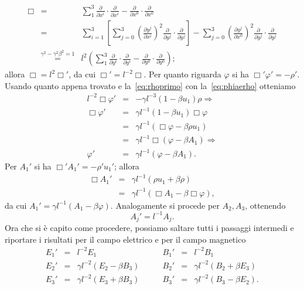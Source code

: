 \begin{eqnarray*}
  \Box & = & \sum_{1}^{3} \frac{\partial}{\partial x^{i}} \cdot
  \frac{\partial}{\partial x^{i}} - 
  \frac{\partial}{\partial x^{0}} \cdot \frac{\partial}{\partial x^{0}}\\
  & = & \sum_{i=1}^{3}\left[ \sum_{j = 0}^{3} 
    \left(\frac{\partial y^{j}}{\partial x^{i}} \right)^{2}
    \frac{\partial}{\partial y^{j}} \cdot 
    \frac{\partial}{\partial y^{j}}\right] -
  \sum_{j=0}^{3} \left( \frac{\partial y^{j}}{\partial
      x^{0}} \right)^{2} 
  \frac{\partial}{\partial y^{j}} \cdot 
  \frac{\partial}{\partial y^{j}}\\
  & \stackrel{\gamma^{2} - \gamma^{2} \beta^{2} = 1}{=} & 
  l^{2} \left( \sum_{1}^{3} 
    \frac{\partial}{\partial y^{i}} \cdot 
    \frac{\partial}{\partial y^{i}} -
    \frac{\partial}{\partial y^{0}} \cdot 
    \frac{\partial}{\partial y^{0}} \right);
\end{eqnarray*}
allora $\Box = l^{2} \Box' $, da cui $\Box' = l^{-2} \Box$. Per quanto
riguarda $\varphi$ si ha $\Box' \varphi' = -\rho' $. Usando quanto
appena trovato e la~\eqref{eq:rhoprimo} con la~\eqref{eq:phiaerho}
otteniamo
\begin{eqnarray*}
  l^{-2} \Box \varphi' & = & 
  - \gamma l ^{-3} (1 - \beta u_{1}) \rho \Longrightarrow \\
  \Box \varphi ' & = & 
  \gamma l^{-1} (1- \beta u_{1}) \Box \varphi \\
  & = & \gamma l^{-1} (\Box \varphi - \beta \rho u_{1}) \\
  & = & \gamma l^{-1} \Box (\varphi - 
  \beta A_{1}) \Longrightarrow \\
  \varphi' & = & \gamma l^{-1} (\varphi - \beta A_{1}).
\end{eqnarray*}
Per $A_{1}'$ si ha $\Box ' A_{1}' = -\rho ' u_{1}'$; allora
\begin{eqnarray*}
  \Box A_{1}' & = & 
  \gamma l^{-1} \left (\rho u_{1} + \beta \rho \right) \\
  & = & \gamma l^{-1} 
  \left (\Box A_{1}  -\beta \Box \varphi \right),
\end{eqnarray*}
da cui $A_{1}' = \gamma l^{-1} (A_{1} - \beta \varphi)$. Analogamente
si procede per $A_{2}, A_{3}$, ottenendo
\begin{displaymath}
  A_{j}' = l ^{-1} A_{j}.
\end{displaymath}
Ora che si \`e capito come procedere, possiamo saltare tutti i
passaggi intermedi e riportare i risultati per il campo elettrico e
per il campo magnetico
\begin{displaymath}
  \begin{array}{rcl}
    E_{1}' & = & l^{-2} E_{1} \\
    E_{2}' & = & \gamma l^{-2} (E_{2} - \beta B_{3}) \\
    E_{3}' & = & \gamma l^{-2} (E_{3} + \beta B_{3})
  \end{array}
  \qquad
  \begin{array}{rcl}
    B_{1}' & = & l^{-2} B_{1} \\
    B_{2}' & = & \gamma l^{-2} (B_{2} + \beta E_{3}) \\
    B_{3}' & = & \gamma l^{-2} (B_{3} - \beta E_{2}). 
  \end{array}
\end{displaymath}

